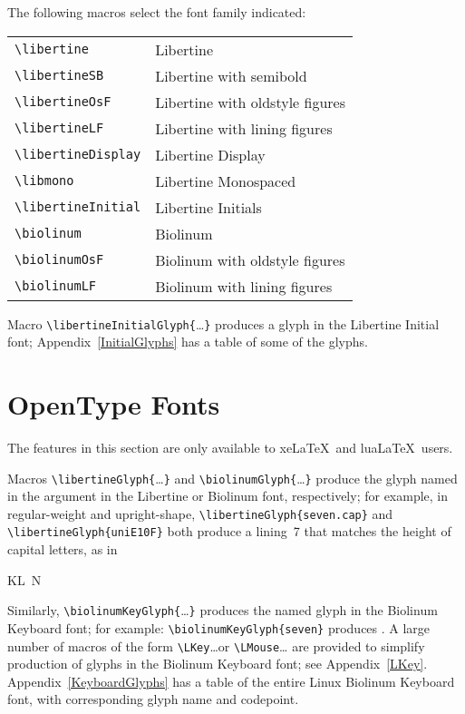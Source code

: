 \documentclass[11pt]{article}
\begin{document}
The following macros select the font family indicated:
\begin{center}
\begin{tabular}{ll}
\verb|\libertine| & Libertine \\
\verb|\libertineSB|& Libertine with semibold \\
\verb|\libertineOsF| & Libertine with oldstyle figures \\
\verb|\libertineLF| & Libertine with lining figures \\
\verb|\libertineDisplay| & Libertine Display \\
\verb|\libmono| & Libertine Monospaced \\
\verb|\libertineInitial| & Libertine Initials \\
\verb|\biolinum| & Biolinum \\
\verb|\biolinumOsF|& Biolinum with oldstyle figures \\
\verb|\biolinumLF| & Biolinum with lining figures \\
\end{tabular}
\end{center}
Macro \verb|\libertineInitialGlyph{|\ldots\verb|}| produces a glyph in the Libertine Initial font;
Appendix~\ref{InitialGlyphs} has a table of some of the glyphs.

\section{OpenType Fonts}
\label{OpenType}

The features in this section are only available to xe\LaTeX\ and lua\LaTeX\ users.

Macros \verb|\libertineGlyph{|\ldots\verb|}| and \verb|\biolinumGlyph{|\ldots\verb|}| produce the
glyph named in the argument in the Libertine or Biolinum font,
respectively; for example, in regular-weight and upright-shape,
\verb|\libertineGlyph{seven.cap}| and \verb|\libertineGlyph{uniE10F}| both produce a
lining~7 that matches the height of capital letters, as in
\begin{list}{}{}\item
KL~N
\end{list} 
Similarly, \verb|\biolinumKeyGlyph{|\ldots\verb|}| produces the named glyph
in the Biolinum Keyboard font; for example: \verb|\biolinumKeyGlyph{seven}| produces .
A large number of macros of the form \verb|\LKey|\ldots or \verb|\LMouse|\ldots
are provided to simplify production of glyphs in the Biolinum Keyboard font;
see Appendix~\ref{LKey}. Appendix~\ref{KeyboardGlyphs} has a table of the entire
Linux Biolinum Keyboard font, with corresponding glyph name and codepoint.
\end{document}

